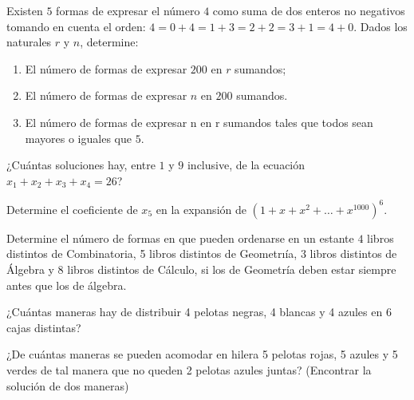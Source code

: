 \begin{problema}
Existen $5$ formas de expresar el número $4$ como suma de dos enteros no negativos tomando en cuenta el orden: $4 = 0 + 4 = 1 + 3 = 2 + 2 = 3 + 1 = 4 + 0$. Dados los naturales $r$ y $n$, determine:
\begin{enumerate}
    \item El número de formas de expresar $200$ en $r$ sumandos;
    \item El número de formas de expresar $n$ en $200$ sumandos.
    \item El número de formas de expresar n en r sumandos tales que todos sean mayores o iguales que $5$.
\end{enumerate}
\end{problema}

\begin{problema}
¿Cuántas soluciones hay, entre $1$ y $9$ inclusive, de la ecuación $x_1+x_2+x_3+x_4=26$?
\end{problema}

\begin{problema}
Determine el coeficiente de $x_5$ en la expansión de $\left(1 + x + x^2 + \dots + x^{1000} \right)^6 $.
\end{problema}

\begin{problema}
Determine el número de formas en que pueden ordenarse en un estante $4$ libros distintos
de Combinatoria, 5 libros distintos de Geometrıía, $3$ libros distintos de Álgebra y $8$ libros distintos de Cálculo, si los de Geometría deben estar siempre antes que los de álgebra.
\end{problema}

\begin{problema}
¿Cuántas maneras hay de distribuir 4 pelotas negras, 4 blancas y 4 azules en 6 cajas distintas?
\end{problema}

\begin{problema}
¿De cuántas maneras se pueden acomodar en hilera 5 pelotas rojas, 5 azules y 5 verdes de tal manera que no queden 2 pelotas azules juntas? (Encontrar la solución de dos maneras)
\end{problema}

